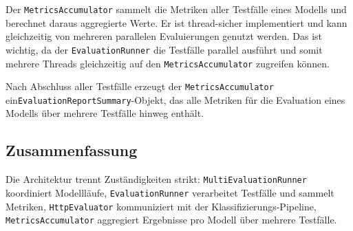 Der \texttt{MetricsAccumulator} sammelt die Metriken aller Testfälle eines Modells und berechnet daraus aggregierte Werte. Er ist thread-sicher implementiert und kann gleichzeitig von mehreren parallelen Evaluierungen genutzt werden. Das ist wichtig, da der \texttt{EvaluationRunner} die Testfälle parallel ausführt und somit mehrere Threads gleichzeitig auf den \texttt{MetricsAccumulator} zugreifen können.

Nach Abschluss aller Testfälle erzeugt der \texttt{MetricsAccumulator} ein\break \texttt{EvaluationReportSummary}-Objekt, das alle Metriken für die Evaluation eines Modells über mehrere Testfälle hinweg enthält.

\subsection*{Zusammenfassung}

Die Architektur trennt Zuständigkeiten strikt:
\texttt{MultiEvaluationRunner} koordiniert Modellläufe,
\texttt{EvaluationRunner} verarbeitet Testfälle und sammelt Metriken,
\texttt{HttpEvaluator} kommuniziert mit der Klassifizierungs-Pipeline,
\texttt{MetricsAccumulator} aggregiert Ergebnisse pro Modell über mehrere Testfälle.
